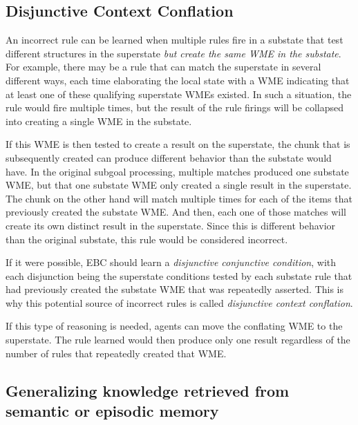 \subsection{Disjunctive Context Conflation}

An incorrect rule can be learned when multiple rules fire in a substate that test different structures in the superstate \emph{but create the same WME in the substate}. For example, there may be a rule that can match the superstate in several different ways, each time elaborating the local state with a WME indicating that at least one of these qualifying superstate WMEs existed. In such a situation, the rule would fire multiple times, but the result of the rule firings will be collapsed into creating a single WME in the substate. 

If this WME is then tested to create a result on the superstate, the chunk that is subsequently created can produce different behavior than the substate would have. In the original subgoal processing, multiple matches produced one substate WME, but that one substate WME only created a single result in the superstate.  The chunk on the other hand will match multiple times for each of the items that previously created the substate WME.  And then, each one of those matches will create its own distinct result in the superstate.   Since this is different behavior than the original substate, this rule would be considered incorrect. 

If it were possible, EBC should learn a \textit{disjunctive conjunctive condition}, with each disjunction being the superstate conditions tested by each substate rule that had previously created the substate WME that was repeatedly asserted.  This is why this potential source of incorrect rules is called \textit{disjunctive context conflation}.

If this type of reasoning is needed, agents can move the conflating WME to the superstate.  The rule learned would then produce only one result regardless of the number of rules that repeatedly created that WME. 

\subsection{Generalizing knowledge retrieved from \\ semantic or episodic memory}

